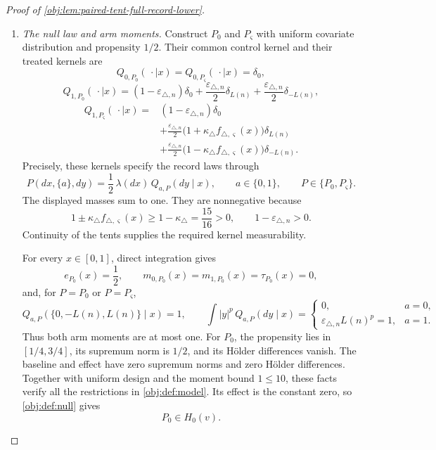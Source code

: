 \documentclass[11pt]{article}
\begin{document}
\begin{proof}[Proof of \cref{obj:lem:paired-tent-full-record-lower}]
\begin{enumerate}
\item \emph{The null law and arm moments.}
Construct \(P_0\) and \(P_\varsigma\) with uniform covariate distribution and
propensity \(1/2\). Their common control kernel and their treated kernels are
\[
Q_{0,P_0}(\,\cdot\mid x)
=
Q_{0,P_\varsigma}(\,\cdot\mid x)=\delta_0,
\]
\[
Q_{1,P_0}(\,\cdot\mid x)
=
(1-\varepsilon_{\triangle,n})\delta_0
+\frac{\varepsilon_{\triangle,n}}2\delta_{L(n)}
+\frac{\varepsilon_{\triangle,n}}2\delta_{-L(n)},
\]
\[
\begin{aligned}
Q_{1,P_\varsigma}(\,\cdot\mid x)
={}&(1-\varepsilon_{\triangle,n})\delta_0\\
&+\frac{\varepsilon_{\triangle,n}}2
 \bigl(1+\kappa_\triangle f_{\triangle,\varsigma}(x)\bigr)\delta_{L(n)}\\
&+\frac{\varepsilon_{\triangle,n}}2
 \bigl(1-\kappa_\triangle f_{\triangle,\varsigma}(x)\bigr)\delta_{-L(n)}.
\end{aligned}
\]
Precisely, these kernels specify the record laws through
\[
P(dx,\{a\},dy)
=\frac12\,\lambda(dx)\,Q_{a,P}(dy\mid x),
\qquad
a\in\{0,1\},
\qquad
P\in\{P_0,P_\varsigma\}.
\]
The displayed masses sum to one. They are nonnegative because
\[
1\pm\kappa_\triangle f_{\triangle,\varsigma}(x)
\ge1-\kappa_\triangle=\frac{15}{16}>0,
\qquad
1-\varepsilon_{\triangle,n}>0.
\]
Continuity of the tents supplies the required kernel measurability.

For every \(x\in[0,1]\), direct integration gives
\[
e_{P_0}(x)=\frac12,
\qquad
m_{0,P_0}(x)=m_{1,P_0}(x)=\tau_{P_0}(x)=0,
\]
and, for \(P=P_0\) or \(P=P_\varsigma\),
\[
Q_{a,P}(\{0,-L(n),L(n)\}\mid x)=1,
\qquad
\int |y|^p\,Q_{a,P}(dy\mid x)
=
\begin{cases}
0,&a=0,\\
\varepsilon_{\triangle,n}L(n)^p=1,&a=1.
\end{cases}
\]
Thus both arm moments are at most one. For \(P_0\), the propensity lies in
\([1/4,3/4]\), its supremum norm is \(1/2\), and its Hölder differences vanish.
The baseline and effect have zero supremum norms and zero Hölder differences.
Together with uniform design and the moment bound \(1\le10\), these facts
verify all the restrictions in \cref{obj:def:model}. Its effect is the constant
zero, so \cref{obj:def:null} gives
\[
P_0\in H_0(v).
\]


\end{enumerate}
\end{proof}
\end{document}
